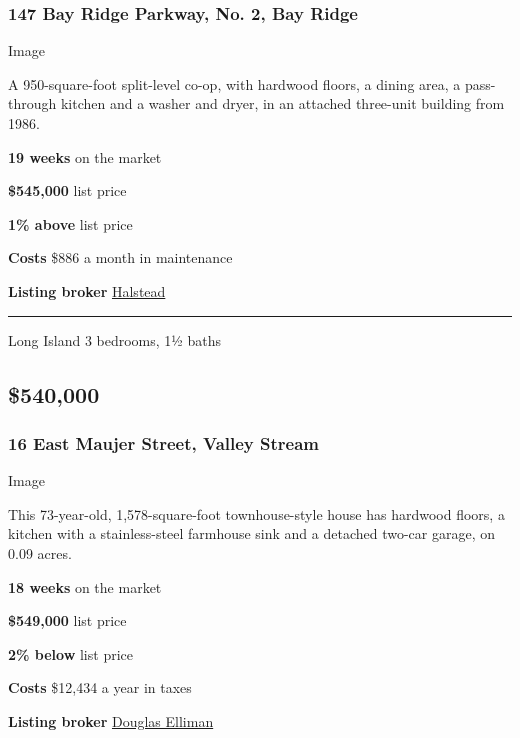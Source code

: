 \hypertarget{147-bay-ridge-parkway-no-2-bay-ridge}{%
\subsubsection{\texorpdfstring{\textbf{147 Bay Ridge Parkway, No. 2, Bay
Ridge}}{147 Bay Ridge Parkway, No. 2, Bay Ridge}}\label{147-bay-ridge-parkway-no-2-bay-ridge}}

Image

A 950-square-foot split-level co-op, with hardwood floors, a dining
area, a pass-through kitchen and a washer and dryer, in an attached
three-unit building from 1986.

\textbf{19 weeks} on the market

\textbf{\$545,000} list price

\textbf{1\% above} list price

\textbf{Costs} \$886 a month in maintenance

\textbf{Listing broker}
\href{https://streeteasy.com/sale/1458626}{Halstead}

\begin{center}\rule{0.5\linewidth}{\linethickness}\end{center}

Long Island \textbar{} 3 bedrooms, 1½ baths

\hypertarget{540000}{%
\subsection{\$540,000}\label{540000}}

\hypertarget{16-east-maujer-street-valley-stream}{%
\subsubsection{\texorpdfstring{\textbf{16 East Maujer Street, Valley
Stream}}{16 East Maujer Street, Valley Stream}}\label{16-east-maujer-street-valley-stream}}

Image

This 73-year-old, 1,578-square-foot townhouse-style house has hardwood
floors, a kitchen with a stainless-steel farmhouse sink and a detached
two-car garage, on 0.09 acres.

\textbf{18 weeks} on the market

\textbf{\$549,000} list price

\textbf{2\% below} list price

\textbf{Costs} \$12,434 a year in taxes

\textbf{Listing broker}
\href{https://www.elliman.com/newyork/sold/detail/612-l-581-16_3195876/16-e-maujer-street-valley-stream-ny-11580}{Douglas
Elliman}

